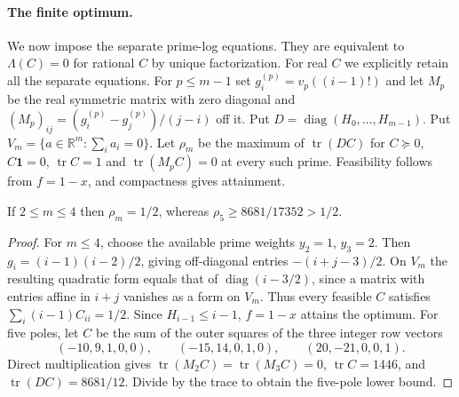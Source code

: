 \documentclass[11pt,a4paper,oneside,openany]{report}
\theoremstyle{remark}\newtheorem{remark}[theorem]{Remark}
\numberwithin{equation}{section}
\begin{document}
\paragraph{The finite optimum.}
We now impose the separate prime-log equations. They are equivalent to
$\Lambda(C)=0$ for rational $C$ by unique factorization. For real $C$
we explicitly retain all the separate equations. For $p\le m-1$ set
$g_i^{(p)}=v_p((i-1)!)$ and let $M_p$ be the real symmetric matrix with
zero diagonal and $(M_p)_{ij}=(g_i^{(p)}-g_j^{(p)})/(j-i)$ off it.
Put $D=\operatorname{diag}(H_0,\ldots,H_{m-1})$.
Put $V_m=\{a\in\mathbb R^m:\sum_i a_i=0\}$. Let $\rho_m$ be the maximum of $\operatorname{tr}(DC)$ for
$C\succeq0$, $C\mathbf 1=0$, $\operatorname{tr}C=1$ and
$\operatorname{tr}(M_pC)=0$ at every such prime. Feasibility
follows from $f=1-x$, and compactness gives attainment.

\begin{proposition}\label{ch3:st:psdsmall}
If $2\le m\le4$ then $\rho_m=1/2$, whereas
$\rho_5\ge8681/17352>1/2$.
\end{proposition}
\begin{proof}
For $m\le4$, choose the available prime weights $y_2=1$, $y_3=2$.
Then $g_i=(i-1)(i-2)/2$, giving off-diagonal entries
$-(i+j-3)/2$. On $V_m$ the resulting quadratic form equals that of
$\operatorname{diag}(i-3/2)$, since a matrix with entries affine in
$i+j$ vanishes as a form on $V_m$. Thus every feasible $C$ satisfies
$\sum_i(i-1)C_{ii}=1/2$. Since $H_{i-1}\le i-1$, $f=1-x$
attains the optimum. For five poles, let $C$ be the sum of the
outer squares of the three integer row vectors
\[
 (-10,9,1,0,0),\qquad (-15,14,0,1,0),\qquad (20,-21,0,0,1).
\]
Direct multiplication gives $\operatorname{tr}(M_2 C)
=\operatorname{tr}(M_3 C)=0$,
$\operatorname{tr}C=1446$, and $\operatorname{tr}(DC)=8681/12$.
Divide by the trace to obtain the five-pole lower bound.
\end{proof}
\end{document}

